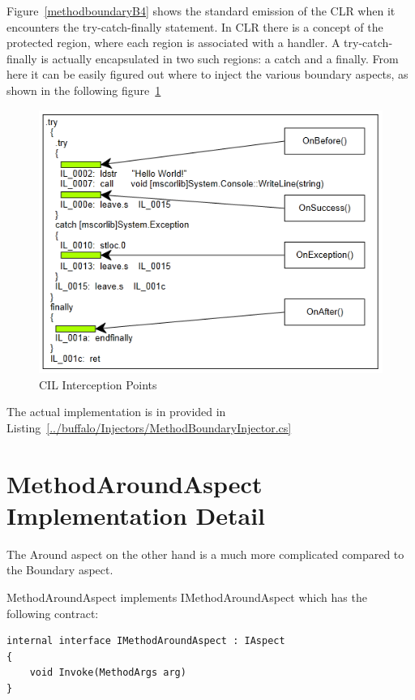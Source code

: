 Figure~\ref{methodboundaryB4} shows the standard emission of the CLR when it encounters the try-catch-finally statement. In CLR there is a concept of the protected region, where each region is associated with a handler. A try-catch-finally is actually encapsulated in two such regions: a catch and a finally. From here it can be easily figured out where to inject the various boundary aspects, as shown in the following figure~\ref{methodboundary02}

\begin{figure}[H]
  \includegraphics[scale=1.0]{MethodBoundaryOverview.PNG}
  \centering
  \caption{CIL Interception Points\label{methodboundary02}}
\end{figure}

The actual implementation is in provided in Listing~\ref{../buffalo/Injectors/MethodBoundaryInjector.cs}

\section{MethodAroundAspect Implementation Detail}

The Around aspect on the other hand is a much more complicated compared to the Boundary aspect.

MethodAroundAspect implements IMethodAroundAspect which has the following contract:

\begin{lstlisting}[caption={IMethodAroundAspect Contract}, label=aroundcontract]
internal interface IMethodAroundAspect : IAspect
{
	void Invoke(MethodArgs arg)
}
\end{lstlisting}

